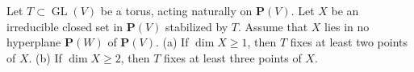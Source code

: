 Let $T \subset \operatorname{GL}(V)$ be a torus, acting naturally on $\mathbf{P}(V)$. Let $X$ be an irreducible closed set in $\mathbf{P}(V)$ stabilized by $T$. Assume that $X$ lies in no hyperplane $\mathbf{P}(W)$ of $\mathbf{P}(V)$.
(a) If $\dim X \geqslant 1$, then $T$ fixes at least two points of $X$.
(b) If $\dim X \geqslant 2$, then $T$ fixes at least three points of $X$.
